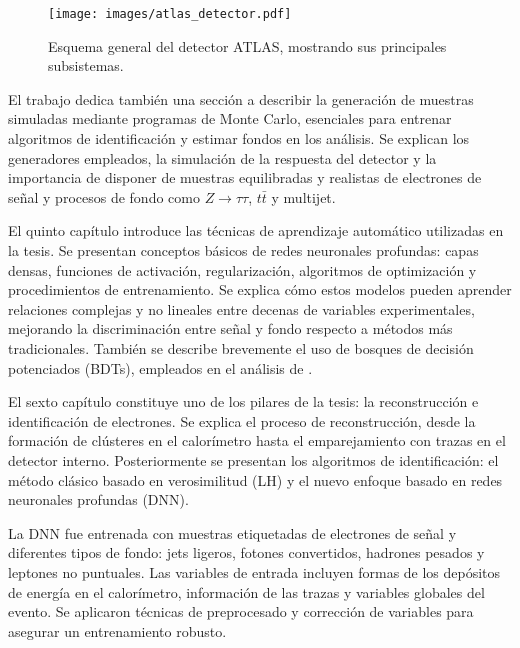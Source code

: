 \begin{figure}[htbp]
  \centering
  \texttt{[image: images/atlas\_detector.pdf]}
  \caption{Esquema general del detector ATLAS, mostrando sus principales subsistemas.}
  \label{fig:atlas_resumen}
\end{figure}

El trabajo dedica también una sección a describir la generación de muestras simuladas mediante programas de Monte
Carlo, esenciales para entrenar algoritmos de identificación y estimar fondos en los análisis. Se explican los
generadores empleados, la simulación de la respuesta del detector y la importancia de disponer de muestras
equilibradas y realistas de electrones de señal y procesos de fondo como $Z\to\tau\tau$, $t\bar{t}$ y multijet.

El quinto capítulo introduce las técnicas de aprendizaje automático utilizadas en la tesis. Se presentan conceptos
básicos de redes neuronales profundas: capas densas, funciones de activación, regularización, algoritmos de
optimización y procedimientos de entrenamiento. Se explica cómo estos modelos pueden aprender relaciones
complejas y no lineales entre decenas de variables experimentales, mejorando la discriminación entre señal y fondo
respecto a métodos más tradicionales. También se describe brevemente el uso de bosques de decisión potenciados
(BDTs), empleados en el análisis de \ttH.

El sexto capítulo constituye uno de los pilares de la tesis: la reconstrucción e identificación de electrones. Se
explica el proceso de reconstrucción, desde la formación de clústeres en el calorímetro hasta el emparejamiento con
trazas en el detector interno. Posteriormente se presentan los algoritmos de identificación: el método clásico
basado en verosimilitud (LH) y el nuevo enfoque basado en redes neuronales profundas (DNN).

La DNN fue entrenada con muestras etiquetadas de electrones de señal y diferentes tipos de fondo: jets ligeros,
fotones convertidos, hadrones pesados y leptones no puntuales. Las variables de entrada incluyen formas de los
depósitos de energía en el calorímetro, información de las trazas y variables globales del evento. Se aplicaron
técnicas de preprocesado y corrección de variables para asegurar un entrenamiento robusto.

